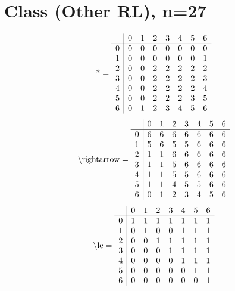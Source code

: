 \documentclass[11pt]{article}
\begin{document}
\section{Class (Other RL), n=27}
\[\text{*} = 
\begin{array}{r | r r r r r r r}
 & 0 & 1 & 2 & 3 & 4 & 5 & 6 \\ \hline
0 & 0 & 0 & 0 & 0 & 0 & 0 & 0 \\
1 & 0 & 0 & 0 & 0 & 0 & 0 & 1 \\
2 & 0 & 0 & 2 & 2 & 2 & 2 & 2 \\
3 & 0 & 0 & 2 & 2 & 2 & 2 & 3 \\
4 & 0 & 0 & 2 & 2 & 2 & 2 & 4 \\
5 & 0 & 0 & 2 & 2 & 2 & 3 & 5 \\
6 & 0 & 1 & 2 & 3 & 4 & 5 & 6 \\
\end{array}
\]
\[\text{\textbackslash rightarrow} = 
\begin{array}{r | r r r r r r r}
 & 0 & 1 & 2 & 3 & 4 & 5 & 6 \\ \hline
0 & 6 & 6 & 6 & 6 & 6 & 6 & 6 \\
1 & 5 & 6 & 5 & 5 & 6 & 6 & 6 \\
2 & 1 & 1 & 6 & 6 & 6 & 6 & 6 \\
3 & 1 & 1 & 5 & 6 & 6 & 6 & 6 \\
4 & 1 & 1 & 5 & 5 & 6 & 6 & 6 \\
5 & 1 & 1 & 4 & 5 & 5 & 6 & 6 \\
6 & 0 & 1 & 2 & 3 & 4 & 5 & 6 \\
\end{array}
\]
\[\text{\textbackslash le} = 
\begin{array}{r | r r r r r r r}
 & 0 & 1 & 2 & 3 & 4 & 5 & 6 \\ \hline
0 & 1 & 1 & 1 & 1 & 1 & 1 & 1 \\
1 & 0 & 1 & 0 & 0 & 1 & 1 & 1 \\
2 & 0 & 0 & 1 & 1 & 1 & 1 & 1 \\
3 & 0 & 0 & 0 & 1 & 1 & 1 & 1 \\
4 & 0 & 0 & 0 & 0 & 1 & 1 & 1 \\
5 & 0 & 0 & 0 & 0 & 0 & 1 & 1 \\
6 & 0 & 0 & 0 & 0 & 0 & 0 & 1 \\
\end{array}
\]
\end{document}
